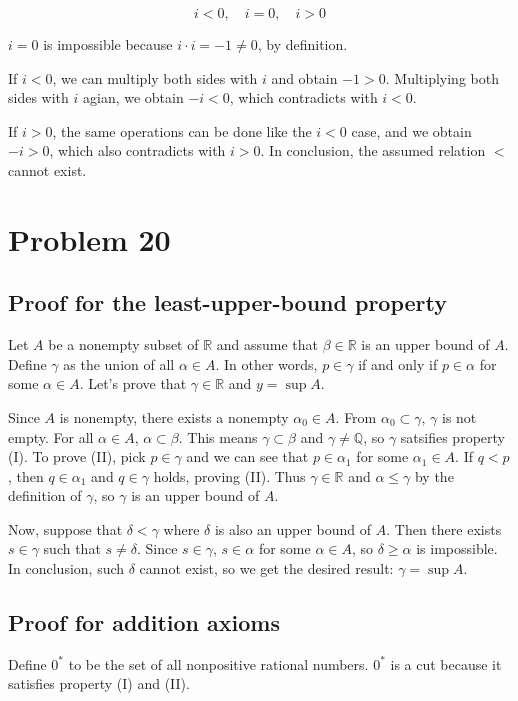 \documentclass{scrartcl}
\begin{document}
\[
  i < 0, \quad i = 0, \quad i > 0
\]

\(i = 0\) is impossible because \(i \cdot i = -1 \not = 0\), by definition.

If \(i < 0\), we can multiply both sides with \(i\) and obtain \(-1 > 0\).
Multiplying both sides with \(i\) agian, we obtain \(-i < 0\), which contradicts with \(i < 0\).

If \(i > 0\), the same operations can be done like the \(i < 0\) case, and we obtain \(-i > 0\), which also contradicts with \(i > 0\).
In conclusion, the assumed relation \(<\) cannot exist.

\section{Problem 20}
\subsection{Proof for the least-upper-bound property}
Let \(A\) be a nonempty subset of \(\mathbb{R}\) and assume that \(\beta \in \mathbb{R}\) is an upper bound of \(A\).
Define \(\gamma\) as the union of all \(\alpha \in A\).
In other words, \(p \in \gamma\) if and only if \(p \in \alpha\) for some \(\alpha \in A\).
Let's prove that \(\gamma \in \mathbb{R}\) and \(y = \sup A\).

Since \(A\) is nonempty, there exists a nonempty \(\alpha_0 \in A\).
From \(\alpha_0 \subset \gamma\), \(\gamma\) is not empty.
For all \(\alpha \in A\), \(\alpha \subset \beta\).
This means \(\gamma \subset \beta\) and \(\gamma \not = \mathbb{Q}\), so \(\gamma\) satsifies property (I).
To prove (II), pick \(p \in \gamma\) and we can see that \(p \in \alpha_1\) for some \(\alpha_1 \in A\).
If \(q < p\), then \(q \in \alpha_1\) and \(q \in \gamma\) holds, proving (II).
Thus \(\gamma \in \mathbb{R}\) and \(\alpha \leq \gamma\) by the definition of \(\gamma\), so \(\gamma\) is an upper bound of \(A\).

Now, suppose that \(\delta < \gamma\) where \(\delta\) is also an upper bound of \(A\).
Then there exists \(s \in \gamma\) such that \(s \not = \delta\).
Since \(s \in \gamma\), \(s \in \alpha\) for some \(\alpha \in A\), so \(\delta \geq \alpha\) is impossible.
In conclusion, such \(\delta\) cannot exist, so we get the desired result: \(\gamma = \sup A\).

\subsection{Proof for addition axioms}
Define \(0^*\) to be the set of all nonpositive rational numbers.
\(0^*\) is a cut because it satisfies property (I) and (II).
\end{document}
